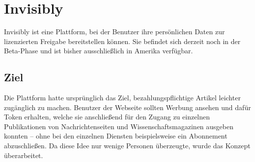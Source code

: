 \section{Invisibly} \label{invisibly}
Invisibly ist eine Plattform, bei der Benutzer ihre persönlichen Daten zur lizenzierten Freigabe bereitstellen können. Sie befindet sich derzeit noch in der Beta-Phase und ist bisher ausschließlich in Amerika verfügbar.

\subsection{Ziel}
Die Plattform hatte ursprünglich das Ziel, bezahlungspflichtige Artikel leichter zugänglich zu machen. Benutzer der Webseite sollten Werbung ansehen und dafür Token erhalten, welche sie anschließend für den Zugang zu einzelnen Publikationen von Nachrichtenseiten und Wissenschaftsmagazinen ausgeben konnten -- ohne bei den einzelnen Diensten beispielsweise ein Abonnement abzuschließen. Da diese Idee nur wenige Personen überzeugte, wurde das Konzept überarbeitet. \cite{techRadarInvisibly_2021} \newline

